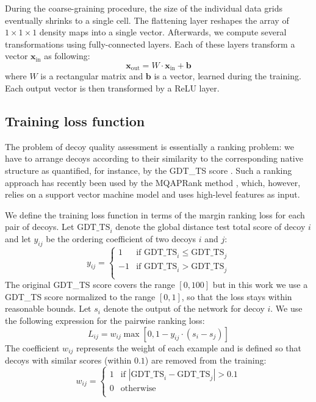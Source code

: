 \documentclass{bioinfo}
\begin{document}
During the coarse-graining procedure, the size of the individual data
grids eventually shrinks to a single cell. The flattening layer
reshapes the array of $1\times 1\times 1$ density maps into a single
vector. Afterwards, we compute several transformations using
fully-connected layers. Each of these layers transform a vector
$\mathbf{x}_\text{in}$ as following:
\begin{equation}
\mathbf{x}_\text{out} = W \cdot \mathbf{x}_\text{in} + \mathbf{b}
\end{equation}
where $W$ is a rectangular matrix and $\mathbf{b}$ is a vector,
learned during the training. Each output vector is then transformed by
a ReLU layer.


\subsection{Training loss function}

The problem of decoy quality assessment is essentially a ranking
problem: we have to arrange decoys according to their similarity to
the corresponding native structure as quantified, for instance, by the
GDT\_TS score \citep{zemla2001casp4}. Such a ranking approach has
recently been used by the MQAPRank method \citep{jing2016sorting},
which, however, relies on a support vector machine model and uses
high-level features as input.

We define the training loss function in terms of
the margin ranking loss \citep{joachims2002optimizing, gong2013deep}
for each pair of decoys.  Let $\text{GDT\_TS}_i$ denote the global
distance test total score of decoy $i$ and let $y_{ij}$ be the
ordering coefficient of two decoys $i$ and $j$:
\begin{equation}
y_{ij} = \begin{cases}
               1& \text{if }\text{GDT\_TS}_i \leq \text{GDT\_TS}_j \\
               -1& \text{if }\text{GDT\_TS}_i > \text{GDT\_TS}_j \\
            \end{cases}
\end{equation}
The original GDT\_TS score covers the range $[0,100]$ but in this work
we use a GDT\_TS score normalized to the range $[0,1]$, so that the
loss stays within reasonable bounds.  Let $s_i$ denote the output of
the network for decoy $i$. We use the following expression for the
pairwise ranking loss:
\begin{equation}
L_{ij} = w_{ij} \max \left[ 0, 1 - y_{ij} \cdot (s_i - s_j) \right]
\end{equation}
The coefficient $w_{ij}$ represents the weight of each example and is
defined so that decoys with similar scores (within $0.1$) are removed
from the training:
\begin{equation}
w_{ij} = \begin{cases}
               1& \text{if } \left| \text{GDT\_TS}_i - \text{GDT\_TS}_j \right| > 0.1 \\
               0& \text{otherwise} \\ 
            \end{cases}
\end{equation}
\end{document}
